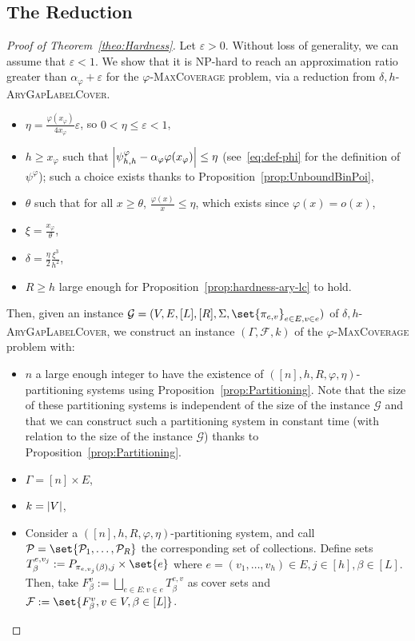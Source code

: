 \subsection{The Reduction}
  \begin{proof}[Proof of Theorem~\ref{theo:Hardness}]
    Let $\varepsilon > 0$. Without loss of generality, we can assume that $\varepsilon < 1$. We show that it is \textrm{NP}-hard to reach an approximation ratio greater than $\alpha_{\varphi} + \varepsilon$ for the $\varphi$-\textsc{MaxCoverage} problem, via a reduction from $\delta,h$-\textsc{AryGapLabelCover}.
  \begin{itemize}
    \item $\eta = \frac{\varphi(x_{\varphi})}{4x_{\varphi}} \varepsilon$, so $0 < \eta \leq \varepsilon < 1$,
    \item $h \geq x_{\varphi}$ such that $\abs{\psi^{\varphi}_{h,h} - \alpha_{\varphi}\varphi(x_{\varphi})} \leq \eta$ (see~\eqref{eq:def-phi} for the definition of $\psi^{\varphi}$); such a choice exists thanks to Proposition~\ref{prop:UnboundBinPoi},
    \item $\theta$ such that for all $x \geq \theta$, $\frac{\varphi(x)}{x} \leq \eta$, which exists since $\varphi(x) = o(x)$,
    \item $\xi = \frac{x_{\varphi}}{\theta}$,
    \item $\delta = \frac{\eta}{2} \frac{\xi^3}{h^2}$,
    \item $R \geq h$ large enough for Proposition~\ref{prop:hardness-ary-lc} to hold.
\end{itemize}
    
Then, given an instance  $\mathcal{G} = (V,E,[L],[R], \Sigma, \set{\pi_{e,v}}_{e \in E, v \in e})$ of $\delta,h$-\textsc{AryGapLabelCover}, we construct an instance $(\Gamma, \mathcal{F}, k)$ of the $\varphi$-\textsc{MaxCoverage} problem with:

    \begin{itemize}
    \item $n$ a large enough integer to have the existence of $([n],h,R,\varphi,\eta)$-partitioning systems using Proposition~\ref{prop:Partitioning}. Note that the size of these partitioning systems is independent of the size of the instance $\mathcal{G}$ and that we can construct such a partitioning system in constant time (with relation to the size of the instance $\mathcal{G}$) thanks to Proposition~\ref{prop:Partitioning}.
    \item $\Gamma = [n] \times E$,
    \item $k =\abs{V}$,
    \item Consider a  $([n],h,R,\varphi,\eta)$-partitioning system, and call $\mathcal{P} =\set{\mathcal{P}_1,\ldots,\mathcal{P}_R}$ the corresponding set of collections. Define sets $T_{\beta}^{e,v_j} := P_{\pi_{e,v_j}(\beta),j} \times \set{e}$ where ${e = (v_1,\ldots,v_h)} \in E, j \in [h], \beta \in [L]$. Then, take $F^v_{\beta} := \bigsqcup_{e \in E:v \in e} T^{e,v}_{\beta}$ as cover sets and $\mathcal{F} := \set{F^v_{\beta}, v \in V, \beta \in [L]}$.
  \end{itemize}


\end{proof}
